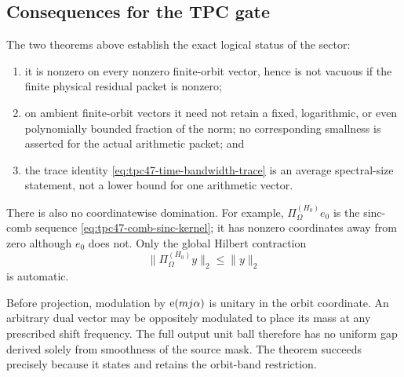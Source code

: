 \subsection{Consequences for the TPC gate}

The two theorems above establish the exact logical status of the
sector:
\begin{enumerate}[label=\textup{(\roman*)},leftmargin=2.4em]
 \item it is nonzero on every nonzero finite-orbit vector, hence is not
       vacuous if the finite physical residual packet is nonzero;
 \item on ambient finite-orbit vectors it need not retain a fixed,
       logarithmic, or even polynomially bounded fraction of the norm;
       no corresponding smallness is asserted for the actual arithmetic
       packet; and
 \item the trace identity \eqref{eq:tpc47-time-bandwidth-trace} is an
       average spectral-size statement, not a lower bound for one
       arithmetic vector.
\end{enumerate}

There is also no coordinatewise domination.  For example,
\(\Pi_{\Omega}^{(H_0)}e_0\) is the sinc-comb sequence
\eqref{eq:tpc47-comb-sinc-kernel}; it has nonzero coordinates away from
zero although \(e_0\) does not.  Only the global Hilbert contraction
\begin{equation}
 \|\Pi_{\Omega}^{(H_0)}y\|_2\le\|y\|_2
 \label{eq:tpc47-global-contraction}
\end{equation}
is automatic.

\begin{remark}
\label{rem:tpc47-arbitrary-dual-field}
Before projection, modulation by \(\mathrm e(mj\alpha)\) is unitary in the
orbit coordinate.  An arbitrary dual vector may be oppositely
modulated to place its mass at any prescribed shift frequency.  The
full output unit ball therefore has no uniform gap derived solely from
smoothness of the source mask.  The theorem succeeds precisely because
it states and retains the orbit-band restriction.
\end{remark}
